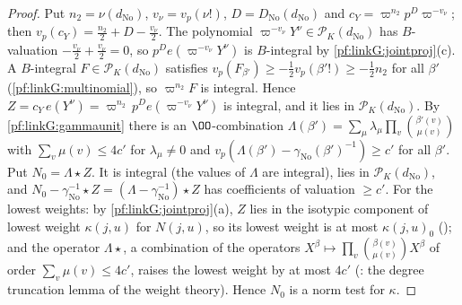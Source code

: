 \begin{proof}
Put $n_2=\nu(d_{\mathrm{No}})$, $v_\nu=v_p(\nu!)$, $D=D_{\mathrm{No}}(d_{\mathrm{No}})$ and $c_Y=\varpi^{n_2}p^D\varpi^{-v_\nu}$; then
$v_p(c_Y)=\frac{n_2}2+D-\frac{v_\nu}2$. The polynomial $\varpi^{-v_\nu}Y^\nu\in\mathcal P_K(d_{\mathrm{No}})$ has $B$-valuation
$-\frac{v_\nu}2+\frac{v_\nu}2=0$, so $p^De(\varpi^{-v_\nu}Y^\nu)$ is $B$-integral by \cref{pf:linkG:jointproj}(c). A $B$-integral
$F\in\mathcal P_K(d_{\mathrm{No}})$ satisfies $v_p(F_{\beta'})\ge-\frac12v_p(\beta'!)\ge-\frac12n_2$ for all $\beta'$ (\cref{pf:linkG:multinomial}), so
$\varpi^{n_2}F$ is integral. Hence $Z=c_Y\,e(Y^\nu)=\varpi^{n_2}\,p^De(\varpi^{-v_\nu}Y^\nu)$ is integral, and it lies in
$\mathcal P_K(d_{\mathrm{No}})$. By \cref{pf:linkG:gammaunit} there is an $\OO$-combination $\Lambda(\beta')=\sum_\mu\lambda_\mu\prod_v\binom{\beta'(v)}{\mu(v)}$
with $\sum_v\mu(v)\le4c'$ for $\lambda_\mu\ne0$ and $v_p(\Lambda(\beta')-\gamma_{\mathrm{No}}(\beta')^{-1})\ge c'$ for all $\beta'$. Put
$N_0=\Lambda\star Z$. It is integral (the values of $\Lambda$ are integral), lies in $\mathcal P_K(d_{\mathrm{No}})$, and
$N_0-\gamma_{\mathrm{No}}^{-1}\star Z=(\Lambda-\gamma_{\mathrm{No}}^{-1})\star Z$ has coefficients of valuation $\ge c'$. For the lowest weights: by
\cref{pf:linkG:jointproj}(a), $Z$ lies in the isotypic component of lowest weight $\kappa(j,u)$ for $N(j,u)$, so its lowest weight is at most
$\kappa(j,u)_0$ (); and the operator $\Lambda\star$, a
combination of the operators $X^\beta\mapsto\prod_v\binom{\beta(v)}{\mu(v)}X^\beta$ of order $\sum_v\mu(v)\le4c'$, raises the lowest weight by at most
$4c'$ (: the degree truncation lemma of the weight theory). Hence
$N_0$ is a norm test for $\kappa$.
\end{proof}

